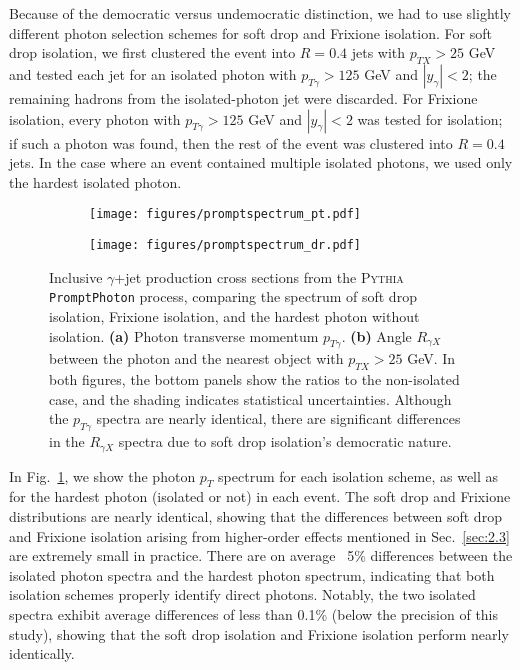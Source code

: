 \documentclass[a4paper,11pt]{article}
\DeclareRobustCommand{\Sec}[1]{Sec.~\ref{#1}}
\DeclareRobustCommand{\Fig}[1]{Fig.~\ref{#1}}
\begin{document}
Because of the democratic versus undemocratic distinction, we had to use slightly different photon selection schemes for soft drop and Frixione isolation.
%
For soft drop isolation, we first clustered the event into $R = 0.4$ jets with $p_{T X} > 25$ GeV and tested each jet for an isolated photon with $p_{T\gamma} > 125$ GeV and $|y_{\gamma}| < 2$; the remaining hadrons from the isolated-photon jet were discarded.
%
For Frixione isolation, every photon with $p_{T\gamma} > 125$ GeV and $|y_{\gamma}| < 2$ was tested for isolation; if such a photon was found, then the rest of the event was clustered into $R = 0.4$ jets.
%
In the case where an event contained multiple isolated photons, we used only the hardest isolated photon.

\begin{figure}[t]
    \centering
    \begin{subfigure}[b]{0.47\textwidth}
    \centering
    \texttt{[image: figures/promptspectrum\_pt.pdf]}
    \caption{}
    \label{fig:promptpt}
    \end{subfigure}
    \hfill
    \begin{subfigure}[b]{0.47\textwidth}
    \texttt{[image: figures/promptspectrum\_dr.pdf]}
    \caption{}
    \label{fig:promptdr}
    \end{subfigure}
    \caption{
    Inclusive $\gamma$+jet production cross sections from the \textsc{Pythia} \texttt{PromptPhoton} process, comparing the spectrum of soft drop isolation, Frixione isolation, and the hardest photon without isolation.
    \textbf{(a)} Photon transverse momentum $p_{T \gamma}$.    
    \textbf{(b)} Angle $R_{\gamma X}$ between the photon and the nearest object with $p_{T X} > 25$ GeV.
    In both figures, the bottom panels show the ratios to the non-isolated case, and the shading indicates statistical uncertainties. 
    Although the $p_{T \gamma}$ spectra are nearly identical, there are significant differences in the $R_{\gamma X}$ spectra due to soft drop isolation's democratic nature.}
\end{figure}


In \Fig{fig:promptpt}, we show the photon $p_T$ spectrum for each isolation scheme, as well as for the hardest photon (isolated or not) in each event.
%
The soft drop and Frixione distributions are nearly identical, showing that the differences between soft drop and Frixione isolation arising from higher-order effects mentioned in \Sec{sec:2.3} are extremely small in practice.
%
There are on average ~5\% differences between the isolated photon spectra and the hardest photon spectrum, indicating that both isolation schemes properly identify direct photons.
%
Notably, the two isolated spectra exhibit average differences of less than 0.1\% (below the precision of this study), showing that the soft drop isolation and Frixione isolation perform nearly identically.
\end{document}
